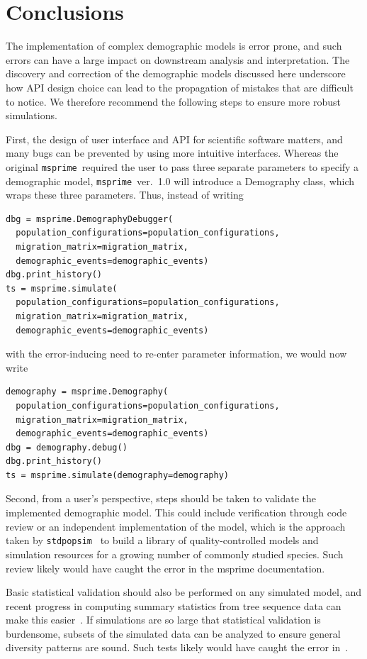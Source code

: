 \documentclass{article}
\newcommand{\msprime}[0]{\texttt{msprime}}
\newcommand{\stdpopsim}[0]{\texttt{stdpopsim}}
\begin{document}
\section{Conclusions}

The implementation of complex demographic models is error prone, and such errors
can have a large impact on downstream analysis and interpretation. 
The discovery and correction of the demographic models discussed here underscore
how API design choice can lead to the propagation of mistakes that are difficult
to notice. We therefore recommend the following steps to ensure more robust simulations.

First, the design of user interface and API for scientific software matters,
and many bugs can be prevented by using more intuitive interfaces.
Whereas the original \msprime\ required the user to pass
three separate parameters to specify a demographic model, \msprime~ver.~1.0
will introduce a Demography class, which wraps these three parameters.
Thus, instead of writing
\begin{lstlisting}[frame=single]
dbg = msprime.DemographyDebugger(
  population_configurations=population_configurations,
  migration_matrix=migration_matrix,
  demographic_events=demographic_events)
dbg.print_history()
ts = msprime.simulate(
  population_configurations=population_configurations,
  migration_matrix=migration_matrix,
  demographic_events=demographic_events)
\end{lstlisting}
with the error-inducing need to re-enter parameter information,
we would now write
\begin{lstlisting}[frame=single]
demography = msprime.Demography(
  population_configurations=population_configurations,
  migration_matrix=migration_matrix,
  demographic_events=demographic_events)
dbg = demography.debug()
dbg.print_history()
ts = msprime.simulate(demography=demography)
\end{lstlisting}

Second, from a user's perspective, steps should be taken to validate the implemented
demographic model. This could include verification through code review or an
independent implementation of the model, which is the approach taken by
\stdpopsim~\citep{adrion2019community} to build a library of quality-controlled
models and simulation resources for a growing number of commonly studied species. 
Such review likely would have caught the error in the msprime documentation.


Basic statistical validation should also be performed on any simulated model, and
recent progress in computing summary statistics from tree sequence data can make
this easier~\citep{ralph2020efficiently}. If simulations are so large that statistical
validation is burdensome, subsets of the simulated data can be analyzed to ensure
general diversity patterns are sound. Such tests likely would have caught the error
in~\citet{martin2017human}.
\end{document}
